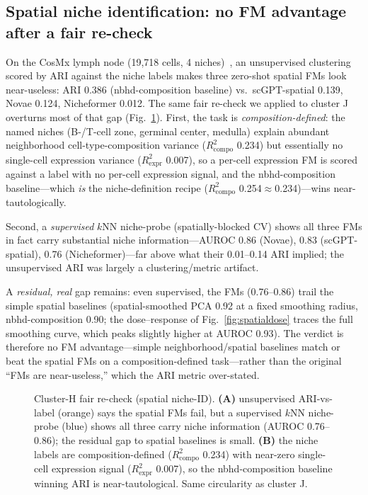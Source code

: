 \documentclass[11pt]{article}
\begin{document}
\subsection{Spatial niche identification: no FM advantage after a fair re-check}
On the CosMx lymph node (19{,}718 cells, 4 niches)~\cite{wang2026niche}, an unsupervised clustering scored by ARI against the niche labels makes three zero-shot spatial FMs look near-useless: ARI 0.386 (nbhd-composition baseline) vs.\ scGPT-spatial 0.139, Novae 0.124, Nicheformer 0.012. The same fair re-check we applied to cluster J overturns most of that gap (Fig.~\ref{fig:spfair}). First, the task is \emph{composition-defined}: the named niches (B-/T-cell zone, germinal center, medulla) explain abundant neighborhood cell-type-composition variance ($R^2_{\mathrm{compo}}$ 0.234) but essentially no single-cell expression variance ($R^2_{\mathrm{expr}}$ 0.007), so a per-cell expression FM is scored against a label with no per-cell expression signal, and the nbhd-composition baseline---which \emph{is} the niche-definition recipe ($R^2_{\mathrm{compo}}$ 0.254$\approx$0.234)---wins near-tautologically.

Second, a \emph{supervised} $k$NN niche-probe (spatially-blocked CV) shows all three FMs in fact carry substantial niche information---AUROC 0.86 (Novae), 0.83 (scGPT-spatial), 0.76 (Nicheformer)---far above what their 0.01--0.14 ARI implied; the unsupervised ARI was largely a clustering/metric artifact.

A \emph{residual, real} gap remains: even supervised, the FMs (0.76--0.86) trail the simple spatial baselines (spatial-smoothed PCA 0.92 at a fixed smoothing radius, nbhd-composition 0.90; the dose--response of Fig.~\ref{fig:spatialdose} traces the full smoothing curve, which peaks slightly higher at AUROC 0.93). The verdict is therefore no FM advantage---simple neighborhood/spatial baselines match or beat the spatial FMs on a composition-defined task---rather than the original ``FMs are near-useless,'' which the ARI metric over-stated.

\begin{figure}[htb]\centering
\caption{Cluster-H fair re-check (spatial niche-ID). \textbf{(A)} unsupervised ARI-vs-label (orange) says the spatial FMs fail, but a supervised $k$NN niche-probe (blue) shows all three carry niche information (AUROC 0.76--0.86); the residual gap to spatial baselines is small. \textbf{(B)} the niche labels are composition-defined ($R^2_{\mathrm{compo}}$ 0.234) with near-zero single-cell expression signal ($R^2_{\mathrm{expr}}$ 0.007), so the nbhd-composition baseline winning ARI is near-tautological. Same circularity as cluster J.}\label{fig:spfair}\end{figure}
\end{document}
